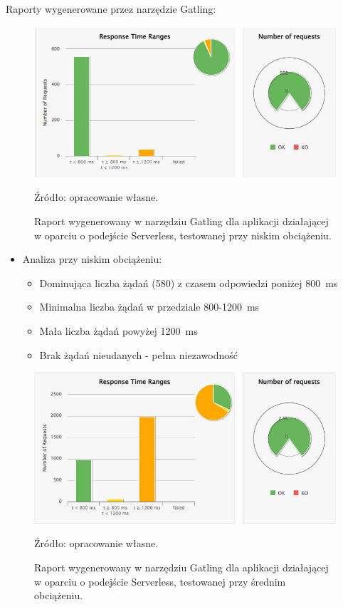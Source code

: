 \documentclass[runningheads,12pt]{llncs}
\begin{document}
\newpage


Raporty wygenerowane przez narzędzie Gatling:

\begin{figure}
    \includegraphics[width=\linewidth]{images/serverless-gatling-low-graph.jpg}
    \caption{Raport wygenerowany w narzędziu Gatling dla aplikacji działającej w oparciu o podejście Serverless, testowanej przy niskim obciążeniu.} \label{fig1}
    \vspace{0.5em}
    {\small Źródło: opracowanie własne.}
\end{figure}

\begin{itemize}
  \item Analiza przy niskim obciążeniu:
  \begin{itemize}
    \item Dominująca liczba żądań (580) z czasem odpowiedzi poniżej 800~ms
    \item Minimalna liczba żądań w przedziale 800-1200~ms
    \item Mała liczba żądań powyżej 1200~ms
    \item Brak żądań nieudanych - pełna niezawodność
  \end{itemize}
\end{itemize}

\newpage

\begin{figure}
    \includegraphics[width=\linewidth]{images/serverless-gatling-middle-graph.jpg}
    \caption{Raport wygenerowany w narzędziu Gatling dla aplikacji działającej w oparciu o podejście Serverless, testowanej przy średnim obciążeniu.} \label{fig2}
    \vspace{0.5em}
    {\small Źródło: opracowanie własne.}
\end{figure}
\end{document}
